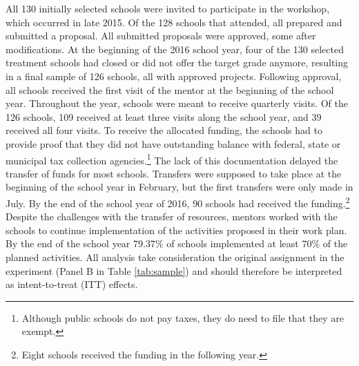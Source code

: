 \documentclass[11pt,a4paper]{article}
\begin{document}
All 130 initially selected schools were invited to participate in the workshop, which occurred in late 2015. Of the 128 schools that attended, all prepared and submitted a proposal. All submitted proposals were approved, some after modifications. At the beginning of the 2016 school year, four of the 130 selected treatment schools had closed or did not offer the target grade anymore, resulting in a final sample of 126 schools, all with approved projects. Following approval, all schools received the first visit of the mentor at the beginning of the school year. Throughout the year, schools were meant to receive quarterly visits. Of the 126 schools, 109 received at least three visits along the school year, and 39 received all four visits. To receive the allocated funding, the schools had to provide proof that they did not have outstanding balance with federal, state or municipal tax collection agencies.\footnote{Although public schools do not pay taxes, they do need to file that they are exempt.} The lack of this documentation delayed the transfer of funds for most schools. Transfers were supposed to take place at the beginning of the school year in February, but the first transfers were only made in July. By the end of the school year of 2016, 90 schools had received the funding.\footnote{Eight schools received the funding in the following year.} Despite the challenges with the transfer of resources, mentors worked with the schools to continue implementation of the activities proposed in their work plan. By the end of the school year 79.37\% of schools implemented at least 70\% of the planned activities. All analysis take consideration the original assignment in the experiment (Panel B in Table \ref{tab:sample}) and should therefore be interpreted as intent-to-treat (ITT) effects.
\end{document}
